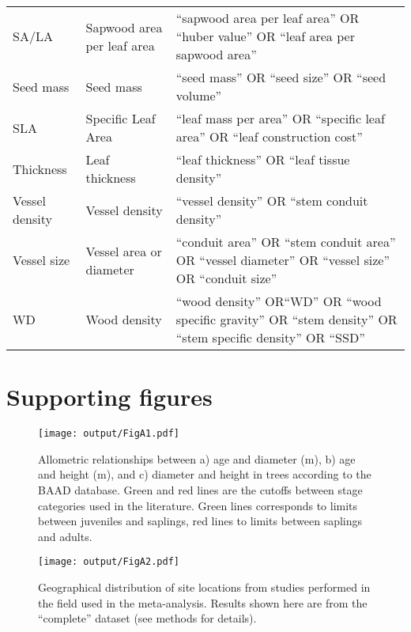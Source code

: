 \documentclass[a4paper,11pt]{article}
\begin{document}
\begin{appendices}
\begin{table}[h!]
{\begin{tabular}{p{3cm}p{3cm}p{8cm}}
  SA/LA & Sapwood area per leaf area & ``sapwood area per leaf area'' OR ``huber value'' OR ``leaf area per sapwood area'' \\
  Seed mass & Seed mass & ``seed mass'' OR ``seed size'' OR ``seed volume'' \\
  SLA & Specific Leaf Area & ``leaf mass per area'' OR ``specific leaf area'' OR ``leaf construction cost'' \\
  Thickness & Leaf thickness & ``leaf thickness''  OR ``leaf tissue density'' \\
  Vessel density & Vessel density & ``vessel density'' OR ``stem conduit density'' \\
  Vessel size & Vessel area or diameter & ``conduit area'' OR ``stem conduit area'' OR ``vessel diameter'' OR ``vessel size'' OR ``conduit size''   \\
  WD & Wood density & ``wood density'' OR``WD'' OR ``wood specific gravity'' OR ``stem density'' OR ``stem specific density'' OR ``SSD'' \\
   \hline
\end{tabular}
}
\end{table}


\clearpage
\section{Supporting figures}\label{app:supp_info_figures}


\begin{figure}[h!]
\centering
\texttt{[image: output/FigA1.pdf]}
\caption{Allometric relationships between a) age and diameter (m), b) age and height (m), and c) diameter and height in trees according to the BAAD database. Green and red lines are the cutoffs between stage categories used in the literature. Green lines corresponds to limits between juveniles and saplings, red lines to limits between saplings and adults.}
\label{fig:figA1}
\end{figure}


\begin{figure}[h!]
\centering
\texttt{[image: output/FigA2.pdf]}
\caption{Geographical distribution of site locations from studies performed in the field used in the meta-analysis. Results shown here are from the ``complete'' dataset (see methods for details).}
\label{fig:figA2}
\end{figure}



\end{appendices}
\end{document}
